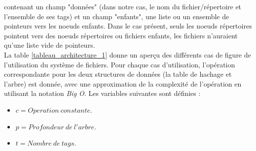\documentclass[a4paper, 12pt]{article}
\begin{document}
contenant un champ "données" (dans notre cas, le nom du fichier/répertoire et l'ensemble de ses tags) 
et un champ "enfants", une liste ou un ensemble de pointeurs vers les noeuds enfants. Dans le cas 
présent, seuls les noeuds répertoires pointent vers des noeuds répertoires ou fichiers enfants, 
les fichiers n'auraient qu'une liste vide de pointeurs.
\\
La table \ref{tableau_architecture_1} donne un aperçu des différents cas de figure de l'utilisation du système 
de fichiers. Pour chaque cas d'utilisation, l'opération correspondante pour les deux structures de 
données (la table de hachage et l'arbre) est donnée, avec une approximation de la complexité de 
l'opération en utilisant la notation \textit{Big O}. Les variables suivantes sont définies :
\begin{itemize}
    \item $c = Operation \ constante$.
    \item $p = Profondeur \ de \ l'arbre$.
    \item $t = Nombre \ de \ tags$.
\end{itemize}
\end{document}
